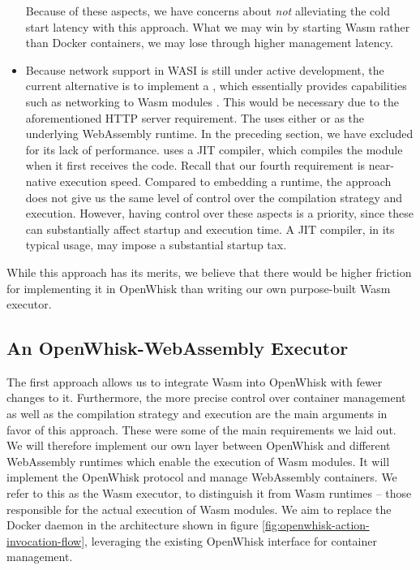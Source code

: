 \begin{itemize}
    Because of these aspects, we have concerns about \emph{not} alleviating the cold start latency with this approach. What we may win by starting Wasm rather than Docker containers, we may lose through higher management latency.
    \item Because network support in WASI is still under active development, the current alternative is to implement a , which essentially provides capabilities such as networking to Wasm modules \cite{WC2021}. This would be necessary due to the aforementioned HTTP server requirement. The  uses either  or  as the underlying WebAssembly runtime. In the preceding section, we have excluded  for its lack of performance.  uses a JIT compiler, which compiles the module when it first receives the code. Recall that our fourth requirement is near-native execution speed. Compared to embedding a runtime, the  approach does not give us the same level of control over the compilation strategy and execution. However, having control over these aspects is a priority, since these can substantially affect startup and execution time. A JIT compiler, in its typical usage, may impose a substantial startup tax.
\end{itemize}

While this approach has its merits, we believe that there would be higher friction for implementing it in OpenWhisk than writing our own purpose-built Wasm executor.

\subsection{An OpenWhisk-WebAssembly Executor}


The first approach allows us to integrate Wasm into OpenWhisk with fewer changes to it. Furthermore, the more precise control over container management as well as the compilation strategy and execution are the main arguments in favor of this approach. These were some of the main requirements we laid out. We will therefore implement our own layer between OpenWhisk and different WebAssembly runtimes which enable the execution of Wasm modules. It will implement the OpenWhisk protocol and manage WebAssembly containers. We refer to this as the Wasm executor, to distinguish it from Wasm runtimes -- those responsible for the actual execution of Wasm modules. We aim to replace the Docker daemon in the architecture shown in figure \ref{fig:openwhisk-action-invocation-flow}, leveraging the existing OpenWhisk interface for container management.

